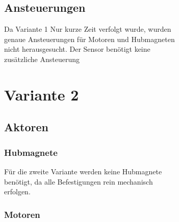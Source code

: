 \begin{figure}[H]
\begin{center}
\begin{figure}[H]
\begin{center}
\subsection{Ansteuerungen}
Da Variante 1 Nur kurze Zeit verfolgt wurde, wurden genaue Ansteuerungen für Motoren und Hubmagneten nicht herausgesucht. Der Sensor benötigt keine zusätzliche Ansteuerung

\section{Variante 2}
\subsection{Aktoren}
\subsubsection{Hubmagnete}
Für die zweite Variante werden keine Hubmagnete benötigt, da alle Befestigungen rein mechanisch erfolgen.

\subsubsection{Motoren}
\begin{figure}[H] 
\begin{center}


\end{center}
\end{figure}
\end{center}
\end{figure}
\end{center}
\end{figure}
